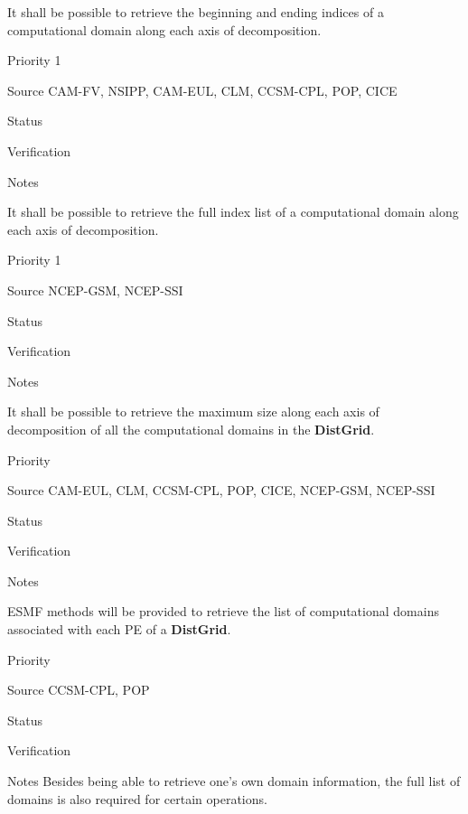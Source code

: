 It shall be possible to retrieve the beginning and ending indices of a
computational domain along each axis of decomposition.

\begin{reqlist}
\item[Priority] 1
\item[Source] CAM-FV, NSIPP, CAM-EUL, CLM, CCSM-CPL, POP, CICE
\item[Status]
\item[Verification]
\item[Notes]
\end{reqlist}


It shall be possible to retrieve the full index list of a
computational domain along each axis of decomposition.

\begin{reqlist}
\item[Priority] 1
\item[Source] NCEP-GSM, NCEP-SSI
\item[Status]
\item[Verification]
\item[Notes]
\end{reqlist}


It shall be possible to retrieve the maximum size along each axis of
decomposition of all the computational domains in the \textbf{DistGrid}. 

\begin{reqlist}
\item[Priority] 
\item[Source] CAM-EUL, CLM, CCSM-CPL, POP, CICE, NCEP-GSM, NCEP-SSI
\item[Status]
\item[Verification]
\item[Notes]
\end{reqlist}


ESMF methods will be provided to retrieve the list of computational
domains associated with each PE of a  \textbf{DistGrid}.

\begin{reqlist}
\item[Priority] 
\item[Source] CCSM-CPL, POP
\item[Status]
\item[Verification]
\item[Notes] Besides being able to retrieve one's own domain
  information, the full list of domains is also required for certain
  operations.
\end{reqlist}

